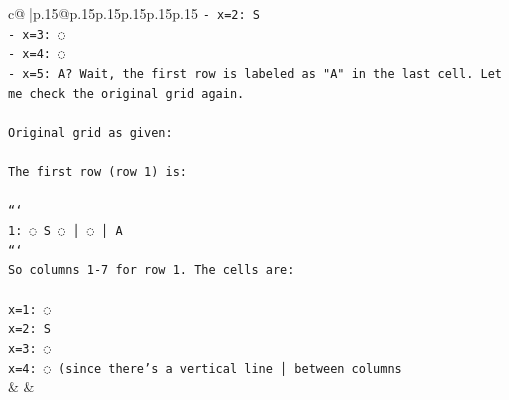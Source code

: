 \documentclass{article}
\begin{document}
{\begin{supertabular}{c@{$\;$}|p{.15\linewidth}@{}p{.15\linewidth}p{.15\linewidth}p{.15\linewidth}p{.15\linewidth}p{.15\linewidth}}
{{{\texttt{{-} x=2: S} \\
\texttt{{-} x=3: ◌} \\
\texttt{{-} x=4: ◌} \\
\texttt{{-} x=5: A? Wait, the first row is labeled as "A" in the last cell. Let me check the original grid again.} \\
\\ 
\texttt{Original grid as given:} \\
\\ 
\texttt{The first row (row 1) is:} \\
\\ 
\texttt{```} \\
\texttt{1: ◌ S ◌ │ ◌ │ A} \\
\texttt{```} \\
\texttt{So columns 1{-}7 for row 1. The cells are:} \\
\\ 
\texttt{x=1: ◌} \\
\texttt{x=2: S} \\
\texttt{x=3: ◌} \\
\texttt{x=4: ◌ (since there's a vertical line │ between columns} \\
            }
        }
    }
    & & \\ \\


\end{supertabular}}
\end{document}
